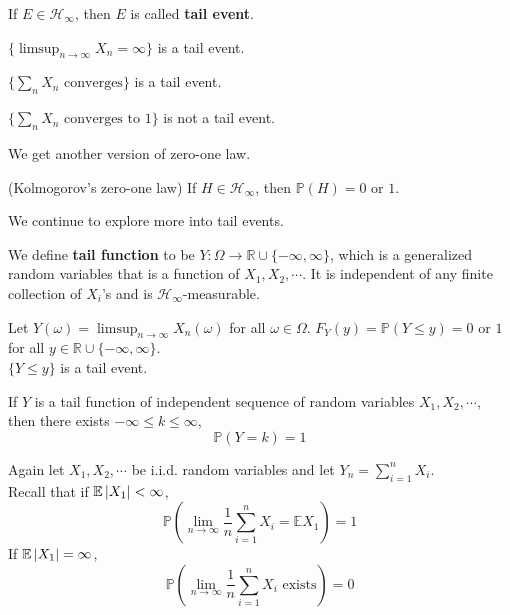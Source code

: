 \documentclass{huhtakm-template-book}
\newcommand{\prob}{\mathbb{P}}
\newcommand{\expect}{\mathbb{E}}
\begin{document}
\begin{rem}
	If $E\in\mathcal{H}_{\infty}$, then $E$ is called \textbf{tail event}.
\end{rem}
\begin{eg}
	$\{\limsup_{n\to\infty}X_{n}=\infty\}$ is a tail event.
\end{eg}
\begin{eg}
	$\{\sum_{n}X_{n}\text{ converges}\}$ is a tail event.
\end{eg}
\begin{eg}
	$\{\sum_{n}X_{n}\text{ converges to }1\}$ is not a tail event.
\end{eg}
We get another version of zero-one law.
\begin{thm}(Kolmogorov's zero-one law)
	If $H\in\mathcal{H}_{\infty}$, then $\prob(H)=0$ or $1$.
\end{thm}
We continue to explore more into tail events.
\begin{defn}
	We define \textbf{tail function} to be $Y:\Omega\to\mathbb{R}\cup\{-\infty,\infty\}$, which is a generalized random variables that is a function of $X_{1},X_{2},\cdots$. It is independent of any finite collection of $X_{i}$'s and is $\mathcal{H}_{\infty}$-measurable.
\end{defn}
\begin{eg}
	Let $Y(\omega)=\limsup_{n\to\infty}X_{n}(\omega)$ for all $\omega\in\Omega$. $F_{Y}(y)=\prob(Y\leq y)=0$ or $1$ for all $y\in\mathbb{R}\cup\{-\infty,\infty\}$.\\
	$\{Y\leq y\}$ is a tail event.
\end{eg}
\begin{thm}
	If $Y$ is a tail function of independent sequence of random variables $X_{1},X_{2},\cdots$, then there exists $-\infty\leq k\leq\infty$,
	\begin{equation*}
		\prob(Y=k)=1
	\end{equation*}
\end{thm}
Again let $X_{1},X_{2},\cdots$ be i.i.d. random variables and let $Y_{n}=\sum_{i=1}^{n}X_{i}$.\\
Recall that if $\expect\abs{X_{1}}<\infty$,
\begin{equation*}
	\prob\left(\lim_{n\to\infty}\frac{1}{n}\sum_{i=1}^{n}X_{i}=\expect X_{1}\right)=1
\end{equation*}
If $\expect\abs{X_{1}}=\infty$,
\begin{equation*}
	\prob\left(\lim_{n\to\infty}\frac{1}{n}\sum_{i=1}^{n}X_{i}\text{ exists}\right)=0
\end{equation*}
\end{document}
